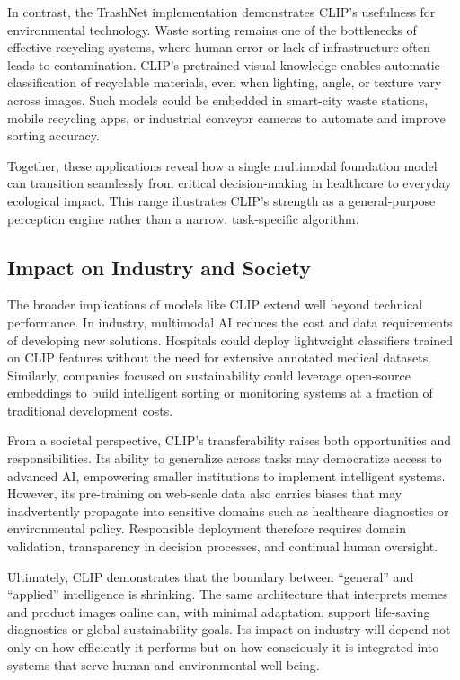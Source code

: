 \documentclass[12pt]{article}
\begin{document}
In contrast, the TrashNet implementation demonstrates CLIP’s usefulness for environmental technology. Waste sorting remains one of the bottlenecks of effective recycling systems, where human error or lack of infrastructure often leads to contamination. CLIP’s pretrained visual knowledge enables automatic classification of recyclable materials, even when lighting, angle, or texture vary across images. Such models could be embedded in smart-city waste stations, mobile recycling apps, or industrial conveyor cameras to automate and improve sorting accuracy.  
\vspace{0.3em}

Together, these applications reveal how a single multimodal foundation model can transition seamlessly from critical decision-making in healthcare to everyday ecological impact. This range illustrates CLIP’s strength as a general-purpose perception engine rather than a narrow, task-specific algorithm.

\subsection{Impact on Industry and Society}
The broader implications of models like CLIP extend well beyond technical performance. In industry, multimodal AI reduces the cost and data requirements of developing new solutions. Hospitals could deploy lightweight classifiers trained on CLIP features without the need for extensive annotated medical datasets. Similarly, companies focused on sustainability could leverage open-source embeddings to build intelligent sorting or monitoring systems at a fraction of traditional development costs.  
\vspace{0.3em}

From a societal perspective, CLIP’s transferability raises both opportunities and responsibilities. Its ability to generalize across tasks may democratize access to advanced AI, empowering smaller institutions to implement intelligent systems. However, its pre-training on web-scale data also carries biases that may inadvertently propagate into sensitive domains such as healthcare diagnostics or environmental policy. Responsible deployment therefore requires domain validation, transparency in decision processes, and continual human oversight.  
\vspace{0.3em}

Ultimately, CLIP demonstrates that the boundary between “general” and “applied” intelligence is shrinking. The same architecture that interprets memes and product images online can, with minimal adaptation, support life-saving diagnostics or global sustainability goals. Its impact on industry will depend not only on how efficiently it performs but on how consciously it is integrated into systems that serve human and environmental well-being.
\end{document}
